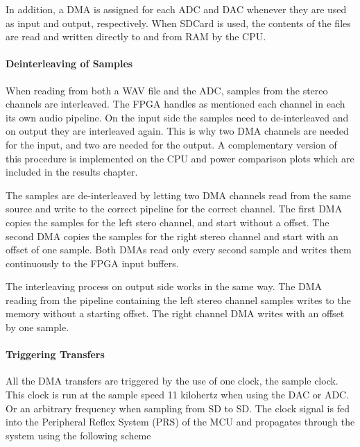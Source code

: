 
In addition, a DMA is assigned for each ADC and DAC whenever they are used as
input and output, respectively. When SDCard is used, the contents of the files
are read and written directly to and from RAM by the CPU.

\paragraph{Deinterleaving of Samples}
When reading from both a WAV file and the ADC, samples from the stereo channels
are interleaved. The FPGA handles as mentioned each channel in each its own
audio pipeline. On the input side the samples need to de-interleaved and on
output they are interleaved again. This is why two DMA channels are needed for
the input, and two are needed for the output. A complementary version of this
procedure is implemented on the CPU and power comparison plots which are
included in the results chapter.


The samples are de-interleaved by letting two DMA channels read from the same
source and write to the correct pipeline for the correct channel. The first DMA
copies the samples for the left stero channel, and start without a offset. The
second DMA copies the samples for the right stereo channel and start with an
offset of one sample. Both DMAs read only every second sample and writes them
continuously to the FPGA input buffers.

The interleaving process on output side works in the same way. The DMA reading
from the pipeline containing the left stereo channel samples writes to the
memory without a starting offset. The right channel DMA writes with an offset by
one sample.

\paragraph{Triggering Transfers}

All the DMA transfers are triggered by the use of one clock, the sample clock.
This clock is run at the sample speed 11 kilohertz when using the DAC or ADC. Or
an arbitrary frequency when sampling from SD to SD. The clock signal is fed into
the Peripheral Reflex System (PRS) of the MCU and propagates through the system
using the following scheme

